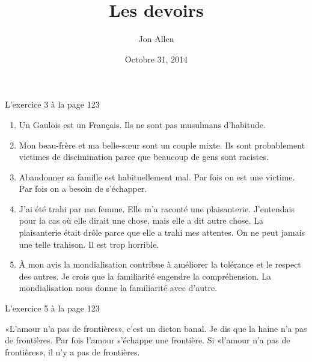 \documentclass[letterpaper]{article}
\begin{document}
\title{Les devoirs}
\date{Octobre 31, 2014}
\author{Jon Allen}
\maketitle
L'exercice 3 à la page 123
\begin{enumerate}
\item
Un Gaulois est un Français. Ils ne sont pas musulmans d'habitude.
\item
Mon beau-frère et ma belle-sœur sont un couple mixte. Ils sont probablement victimes de discimination parce que beaucoup de gens sont racistes.
\item
Abandonner sa famille est habituellement mal. Par fois on est une victime. Par fois on a besoin de s'échapper.
\item
J'ai été trahi par ma femme. Elle m'a raconté une plaisanterie. J'entendais pour la cas où elle dirait une chose, mais elle a dit autre chose. La plaisanterie était drôle parce que elle a trahi mes attentes. On ne peut jamais une telle trahison. Il est trop horrible.
\item
À mon avis la mondialisation contribue à améliorer la tolérance et le respect des autres. Je crois que la familiarité engendre la compréhension. La mondialisation nous donne la familiarité avec d'autre.
\end{enumerate}
L'exercice 5 à la page 123

«L'amour n'a pas de frontières», c'est un dicton banal. Je dis que la haine n'a pas de frontières. Par fois l'amour s'échappe une frontière. Si «l'amour n'a pas de frontières», il n'y a pas de frontières.
\end{document}
